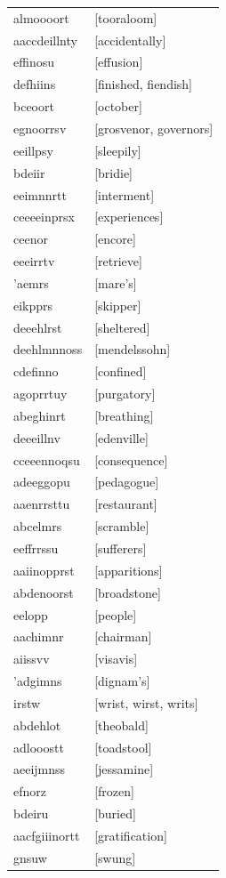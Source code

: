 \documentclass{article}
\begin{document}
\begin{tabular}{ll}
almoooort & [tooraloom] \\
aaccdeillnty & [accidentally] \\
effinosu & [effusion] \\
defhiins & [finished, fiendish] \\
bceoort & [october] \\
egnoorrsv & [grosvenor, governors] \\
eeillpsy & [sleepily] \\
bdeiir & [bridie] \\
eeimnnrtt & [interment] \\
ceeeeinprsx & [experiences] \\
ceenor & [encore] \\
eeeirrtv & [retrieve] \\
'aemrs & [mare's] \\
eikpprs & [skipper] \\
deeehlrst & [sheltered] \\
deehlmnnoss & [mendelssohn] \\
cdefinno & [confined] \\
agoprrtuy & [purgatory] \\
abeghinrt & [breathing] \\
deeeillnv & [edenville] \\
cceeennoqsu & [consequence] \\
adeeggopu & [pedagogue] \\
aaenrrsttu & [restaurant] \\
abcelmrs & [scramble] \\
eeffrrssu & [sufferers] \\
aaiinopprst & [apparitions] \\
abdenoorst & [broadstone] \\
eelopp & [people] \\
aachimnr & [chairman] \\
aiissvv & [visavis] \\
'adgimns & [dignam's] \\
irstw & [wrist, wirst, writs] \\
abdehlot & [theobald] \\
adlooostt & [toadstool] \\
aeeijmnss & [jessamine] \\
efnorz & [frozen] \\
bdeiru & [buried] \\
aacfgiiinortt & [gratification] \\
gnsuw & [swung] \\

\end{tabular}
\end{document}
